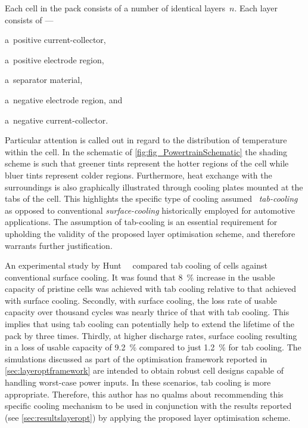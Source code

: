 Each cell in the pack consists of a number of identical layers~$n$. Each layer
consists of ---
\begin{enumerate*}[label=\roman*)]
    \item a~positive current-collector,
    \item a~positive electrode region,
    \item a~separator material,
    \item a~negative electrode region, and
    \item a~negative current-collector.
\end{enumerate*}
Particular attention is called out in  regard to the distribution of temperature
within  the cell.  In  the schematic  of \cref{fig:fig_PowertrainSchematic}  the
shading scheme  is such that greener  tints represent the hotter  regions of the
cell while bluer tints represent colder regions. Furthermore, heat exchange with
the surroundings is also graphically  illustrated through cooling plates mounted
at the tabs  of the cell. This  highlights the specific type  of cooling assumed
\viz~\emph{tab-cooling}  as  opposed to  conventional  \emph{surface-cooling}
historically employed for automotive applications. The assumption of tab-cooling
is an  essential requirement for  upholding the  validity of the  proposed layer
optimisation scheme, and therefore warrants further justification.

An  experimental  study  by   Hunt~\etal~\cite{Hunt2016}  compared  tab  cooling
of  cells  against conventional  surface  cooling.  It  was found  that  \approx
\SI{8}{\percent} increase in the usable  capacity of pristine cells was achieved
with tab cooling relative to that  achieved with surface cooling. Secondly, with
surface  cooling, the  loss rate  of usable  capacity over  thousand cycles  was
nearly thrice of that with tab cooling.  This implies that using tab cooling can
potentially help to extend the lifetime of  the pack by three times. Thirdly, at
higher discharge rates,  surface cooling resulting in a loss  of usable capacity
of \SI{9.2}{\percent} compared  to just \SI{1.2}{\percent} for  tab cooling. The
simulations  discussed  as  part  of  the  optimisation  framework  reported  in
\cref{sec:layeroptframework} are intended to  obtain robust cell designs capable
of handling  worst-case power inputs.  In these  scenarios, tab cooling  is more
appropriate.  Therefore,  this author  has  no  qualms about  recommending  this
specific cooling mechanism  to be used in conjunction with  the results reported
(see  \cref{sec:resultslayeropt}) by  applying the  proposed layer  optimisation
scheme.

